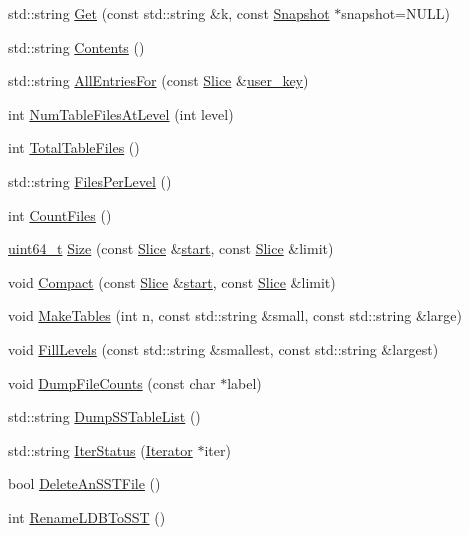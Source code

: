 \begin{DoxyCompactItemize}
\item 
std\+::string \hyperlink{classleveldb_1_1_d_b_test_a6af558e1fca4a9f1bbf86d72d3d4aa6c}{Get} (const std\+::string \&k, const \hyperlink{classleveldb_1_1_snapshot}{Snapshot} $\ast$snapshot=N\+U\+L\+L)
\item 
std\+::string \hyperlink{classleveldb_1_1_d_b_test_a3cf871664bd22c6ed2d6c2a8834b49fc}{Contents} ()
\item 
std\+::string \hyperlink{classleveldb_1_1_d_b_test_adaf171601eaaf2cd24edaa394752f733}{All\+Entries\+For} (const \hyperlink{classleveldb_1_1_slice}{Slice} \&\hyperlink{version__set_8cc_afced2118ae0bf03db7c7e75a21cfd004}{user\+\_\+key})
\item 
int \hyperlink{classleveldb_1_1_d_b_test_aa7c845810f6d57b0655eda370e8de33f}{Num\+Table\+Files\+At\+Level} (int level)
\item 
int \hyperlink{classleveldb_1_1_d_b_test_a05fa745351a41ecc0165b391a605b79e}{Total\+Table\+Files} ()
\item 
std\+::string \hyperlink{classleveldb_1_1_d_b_test_a0e4d6292bcbe450d34b558d48a51a331}{Files\+Per\+Level} ()
\item 
int \hyperlink{classleveldb_1_1_d_b_test_a0c6c0c1d470a50fdcb6cdbc54977e907}{Count\+Files} ()
\item 
\hyperlink{stdint_8h_aaa5d1cd013383c889537491c3cfd9aad}{uint64\+\_\+t} \hyperlink{classleveldb_1_1_d_b_test_a2b16106ccbd302127b5c0575e74e6be1}{Size} (const \hyperlink{classleveldb_1_1_slice}{Slice} \&\hyperlink{db__bench_8cc_ab376b87f96a574a793c03c53e75afec8}{start}, const \hyperlink{classleveldb_1_1_slice}{Slice} \&limit)
\item 
void \hyperlink{classleveldb_1_1_d_b_test_a9b6cd10fd7c8fc54127b0c40c0ac7db5}{Compact} (const \hyperlink{classleveldb_1_1_slice}{Slice} \&\hyperlink{db__bench_8cc_ab376b87f96a574a793c03c53e75afec8}{start}, const \hyperlink{classleveldb_1_1_slice}{Slice} \&limit)
\item 
void \hyperlink{classleveldb_1_1_d_b_test_ace931478fa5ad2c48a8aa95a344e19fd}{Make\+Tables} (int n, const std\+::string \&small, const std\+::string \&large)
\item 
void \hyperlink{classleveldb_1_1_d_b_test_ac291d06db907f5fee7caf04f44f65493}{Fill\+Levels} (const std\+::string \&smallest, const std\+::string \&largest)
\item 
void \hyperlink{classleveldb_1_1_d_b_test_ad045c5203b4ea785ab335ffc3ea833b3}{Dump\+File\+Counts} (const char $\ast$label)
\item 
std\+::string \hyperlink{classleveldb_1_1_d_b_test_afdfc077be555dea7eac220623f6d4deb}{Dump\+S\+S\+Table\+List} ()
\item 
std\+::string \hyperlink{classleveldb_1_1_d_b_test_ad162fa0f5a31e61ee94ba9f45af716f8}{Iter\+Status} (\hyperlink{classleveldb_1_1_iterator}{Iterator} $\ast$iter)
\item 
bool \hyperlink{classleveldb_1_1_d_b_test_abcb2ebeb0733670d7634079c587426d2}{Delete\+An\+S\+S\+T\+File} ()
\item 
int \hyperlink{classleveldb_1_1_d_b_test_a104ae4b9292787d0cfc9a9fb93cc5fa8}{Rename\+L\+D\+B\+To\+S\+S\+T} ()
\end{DoxyCompactItemize}
